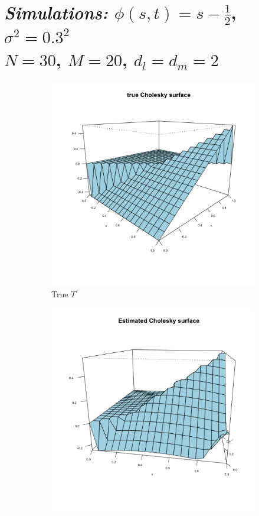 \documentclass[12pt]{article}
\theoremstyle{definition}
\begin{document}
 


 
\section{\emph{Simulations: }$\phi\left(s,t\right) = s-\frac{1}{2}$, $\sigma^2 = 0.3^2$\\
$N = 30$, $M=20$, $d_l = d_m= 2$}

\begin{center}
\begin{figure}[H]
 \begin{subfigure}{.48\textwidth}
 \includegraphics{img/linear-vc-model-true-cholesky}
 \caption{True $T$ }
 \end{subfigure}
     \begin{subfigure}{.48\textwidth}
 \includegraphics{img/linear-vc-model-estimated-cholesky}

\end{subfigure}
\end{figure}
\end{center}
\end{document}
